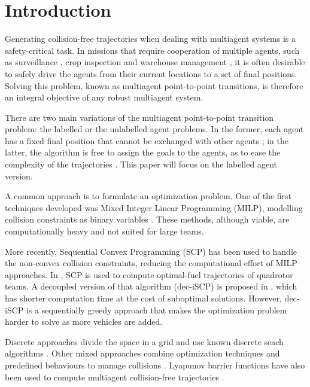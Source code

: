 \section{Introduction}
\label{sec:introduction}
Generating collision-free trajectories when dealing with multiagent systems is a safety-critical task. In missions that require cooperation of multiple agents, such as surveillance \cite{vallejo2009multi}, crop inspection \cite{carbone2018swarm} and warehouse management \cite{guizzo2008three}, it is often desirable to safely drive the agents from their current locations to a set of final positions. Solving this problem, known as multiagent point-to-point transitions, is therefore an integral objective of any robust multiagent system.

There are two main variations of the multiagent point-to-point transition problem: the labelled or the unlabelled agent problems. In the former, each agent has a fixed final position that cannot be exchanged with other agents \cite{schouwenaars2001mixed, augugliaro2012generation}; in the latter, the algorithm is free to assign the goals to the agents, as to ease the complexity of the trajectories \cite{turpin2012decentralized}. This paper will focus on the labelled agent version. 

A common approach is to formulate an optimization problem. One of the first techniques developed was Mixed Integer Linear Programming (MILP), modelling collision constraints as binary variables \cite{schouwenaars2001mixed}. These methods, although viable, are computationally heavy and not suited for large teams.

More recently, Sequential Convex Programming (SCP) \cite{boyd2008sequential} has been used to handle the non-convex collision constraints, reducing the computational effort of MILP approaches. In \cite{augugliaro2012generation}, SCP is used to compute optimal-fuel trajectories of quadrotor teams. A decoupled version of that algorithm (dec-iSCP) is proposed in \cite{chen2015decoupled}, which has shorter computation time at the cost of suboptimal solutions. However, dec-iSCP is a sequentially greedy approach that makes the optimization problem harder to solve as more vehicles are added.

Discrete approaches divide the space in a grid and use known discrete seach algorithms \cite{preiss}. Other mixed approaches combine optimization techniques and predefined behaviours to manage collisions \cite{tang2018complete}. Lyapunov barrier functions have also been used to compute multiagent collision-free trajectories \cite{wang2017safety}.

